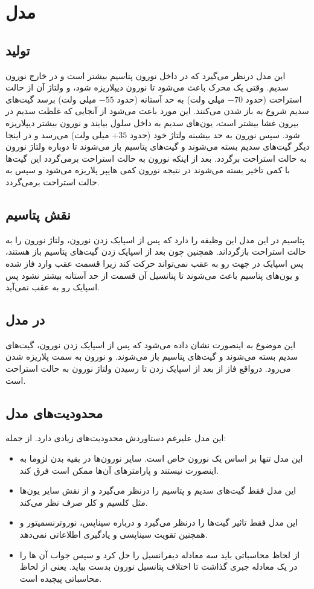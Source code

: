 \section{مدل }
\subsection*{تولید }
این مدل درنظر می‌گیرد که در داخل نورون پتاسیم بیشتر است و در خارج نورون سدیم. وقتی یک محرک باعث می‌شود تا نورون دیپلاریزه شود، و ولتاژ آن از حالت استراحت (حدود $-70$ میلی ولت) به حد آستانه (حدود $-55$ میلی ولت) برسد گیت‌های سدیم شروع به باز شدن می‌کنند. این مورد باعث می‌شود از آنجایی که غلظت سدیم در بیرون غشا بیشتر است، یون‌های سدیم به داخل سلول بیایند و نورون بیشتر دیپلاریزه شود.  سپس نورون به حد بیشینه ولتاژ خود (حدود $+35$ میلی ولت) می‌رسد و در اینجا دیگر گیت‌های سدیم بسته می‌شوند و گیت‌های پتاسیم باز می‌شوند تا دوباره ولتاژ نورون به حالت استراحت برگردد. بعد از اینکه نورون به حالت استراحت برمی‌گردد این گیت‌ها با کمی تاخیر بسته می‌شوند در نتیجه نورون کمی هایپر پلاریزه می‌شود و سپس به حالت استراحت برمی‌گردد. 
\subsection*{نقش پتاسیم}
پتاسیم در این مدل این وظیفه را دارد که پس از اسپایک زدن نورون، ولتاژ نورون را به حالت استراحت بازگرداند. همچنین چون بعد از اسپایک زدن گیت‌های پتاسیم باز هستند، پس اسپایک در جهت رو به عقب نمی‌تواند حرکت کند زیرا قسمت عقب وارد فاز 
شده و یون‌های پتاسیم باعث می‌شوند تا پتانسیل آن قسمت از حد آستانه بیشتر نشود پس اسپایک رو به عقب نمی‌آید.
\subsection*{ در مدل }
این موضوع به اینصورت نشان داده می‌شود که پس از اسپایک زدن نورون، گیت‌های سدیم بسته می‌شوند و گیت‌های پتاسیم باز می‌شوند. و نورون به سمت پلاریزه شدن می‌رود.  درواقع فاز از بعد از اسپایک زدن تا رسیدن ولتاژ نورون به حالت استراحت 
است.
\subsection*{محدودیت‌های مدل }
این مدل علیرغم دستاوردش محدودیت‌های زیادی دارد. از جمله:
\begin{itemize}
	\item 
	این مدل تنها بر اساس یک نورون خاص است. سایر نورون‌ها در بقیه بدن لزوما به اینصورت نیستند و پارامترهای آن‌ها ممکن است فرق کند.
	\item 
	این مدل فقط گیت‌های سدیم و پتاسیم را درنظر می‌گیرد و از نقش سایر یون‌ها مثل کلسیم و کلر صرف نظر می‌کند. 
	\item 
	این مدل فقط تاثیر گیت‌ها را درنظر می‌گیرد و درباره سیناپس، نوروترنسمیتور و همچنین تقویت سیناپسی و یادگیری  اطلاعاتی نمی‌دهد.
	\item 
	از لحاظ محاسباتی باید سه معادله دیفرانسیل را حل کرد و سپس جواب آن ها را در یک معادله جبری گذاشت تا اختلاف پتانسیل نورون بدست بیاید. یعنی از لحاظ محاسباتی پیچیده است. 
\end{itemize}
